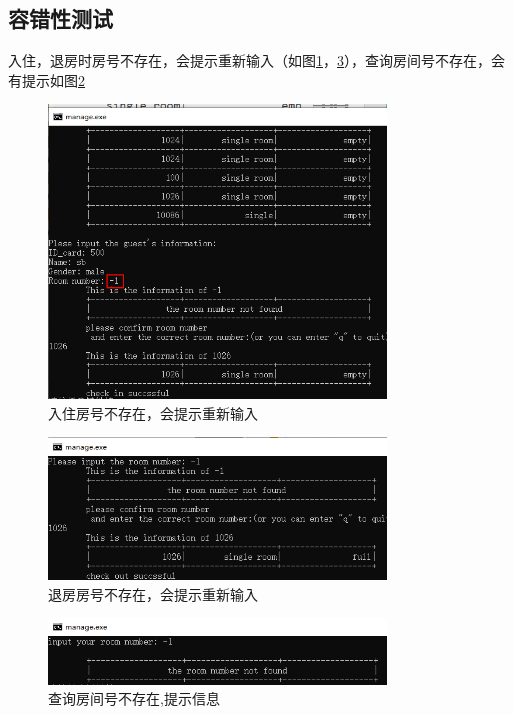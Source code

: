 \documentclass[UTF8]{ctexart}
\begin{document}
  \subsection{容错性测试}
  入住，退房时房号不存在，会提示重新输入（如图\ref{fig:test_1}，\ref{fig:test_3}），查询房间号不存在，会有提示如图\ref{fig:test_2}
  \begin{figure}[H]
    \centering
    \includegraphics[width=0.8\textwidth]{test_1}
    \caption{入住房号不存在，会提示重新输入}
    \label{fig:test_1}
    \end{figure}
  \begin{figure}[H]
    \centering
    \includegraphics[width=0.8\textwidth]{test_2}
    \caption{退房房号不存在，会提示重新输入}
    \label{fig:test_2}
    \end{figure}
  \begin{figure}[H]
    \centering
    \includegraphics[width=0.8\textwidth]{test_3}
    \caption{查询房间号不存在,提示信息}
    \label{fig:test_3}
    \end{figure}
\end{document}
